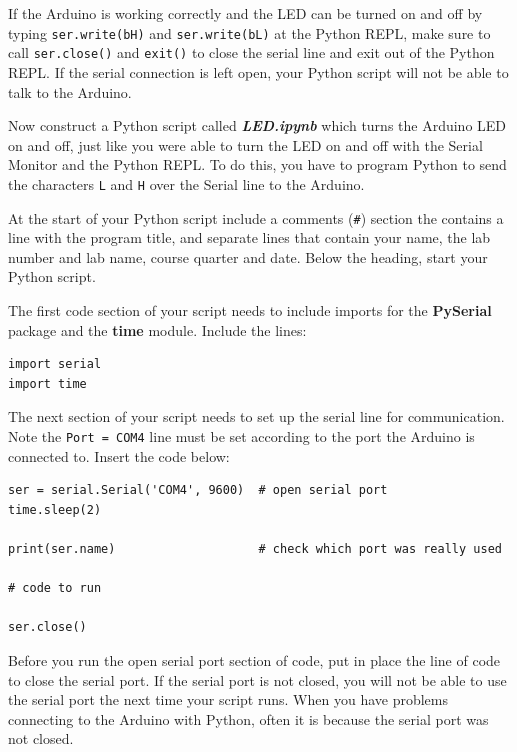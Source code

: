 \documentclass[11pt]{article}
\begin{document}
If the Arduino is working correctly and the LED can be turned on and off
by typing \texttt{ser.write(b\textquotesingle{}H\textquotesingle{})} and
\texttt{ser.write(b\textquotesingle{}L\textquotesingle{})} at the Python
REPL, make sure to call \texttt{ser.close()} and \texttt{exit()} to
close the serial line and exit out of the Python REPL. If the serial
connection is left open, your Python script will not be able to talk to
the Arduino.

Now construct a Python script called \textbf{\emph{LED.ipynb}} which
turns the Arduino LED on and off, just like you were able to turn the
LED on and off with the Serial Monitor and the Python REPL. To do this,
you have to program Python to send the characters \texttt{L} and
\texttt{H} over the Serial line to the Arduino.

    At the start of your Python script include a comments (\texttt{\#})
section the contains a line with the program title, and separate lines
that contain your name, the lab number and lab name, course quarter and
date. Below the heading, start your Python script.

The first code section of your script needs to include imports for the
\textbf{PySerial} package and the \textbf{time} module. Include the
lines:

\begin{verbatim}
import serial
import time
\end{verbatim}

The next section of your script needs to set up the serial line for
communication. Note the
\texttt{Port\ =\ \textquotesingle{}COM4\textquotesingle{}} line must be
set according to the port the Arduino is connected to. Insert the code
below:

\begin{verbatim}
ser = serial.Serial('COM4', 9600)  # open serial port
time.sleep(2)

print(ser.name)                    # check which port was really used

# code to run          

ser.close() 
\end{verbatim}

Before you run the open serial port section of code, put in place the
line of code to close the serial port. If the serial port is not closed,
you will not be able to use the serial port the next time your script
runs. When you have problems connecting to the Arduino with Python,
often it is because the serial port was not closed.
\end{document}
